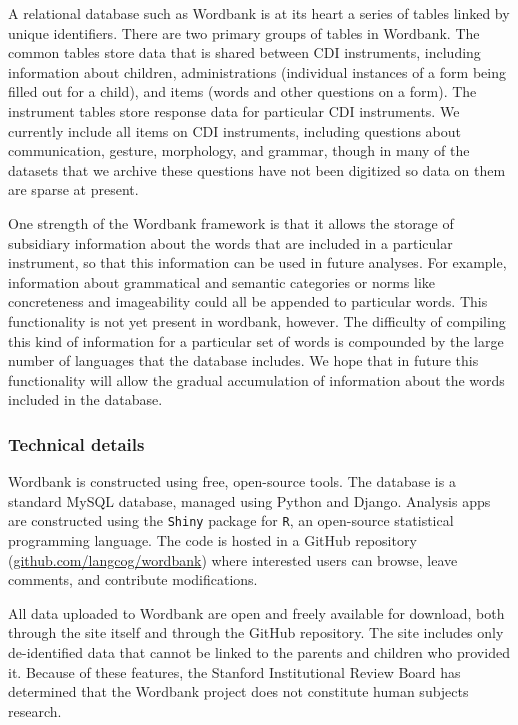 \documentclass[man,noapacite]{apa}
\begin{document}
A relational database such as Wordbank is at its heart a series of tables linked by unique identifiers. There are two primary groups of tables in Wordbank. The common tables store data that is shared between CDI instruments, including information about children, administrations (individual instances of a form being filled out for a child), and items (words and other questions on a form). The instrument tables store response data for particular CDI instruments. We currently include all items on CDI instruments, including questions about communication, gesture, morphology, and grammar, though in many of the datasets that we archive these questions have not been digitized so data on them are sparse at present. 

One strength of the Wordbank framework is that it allows the storage of subsidiary information about the words that are included in a particular instrument, so that this information can be used in future analyses. For example, information about grammatical and semantic categories or norms like concreteness and imageability could all be appended to particular words. This functionality is not yet present in wordbank, however. The difficulty of compiling this kind of information for a particular set of words is compounded by the large number of languages that the database includes. We hope that in future this functionality will allow the gradual accumulation of information about the words included in the database.

\subsubsection{Technical details}

Wordbank is constructed using free, open-source tools. The database is a standard MySQL database, managed using Python and Django. Analysis apps are constructed using the \texttt{Shiny} package for \texttt{R}, an open-source statistical programming language.  The code is hosted in a GitHub repository (\url{github.com/langcog/wordbank}) where interested users can browse, leave comments, and contribute modifications. 

All data uploaded to Wordbank are open and freely available for download, both through the site itself and through the GitHub repository. The site includes only de-identified data that cannot be linked to the parents and children who provided it. Because of these features, the Stanford Institutional Review Board has determined that the Wordbank project does not constitute human subjects research.
\end{document}
